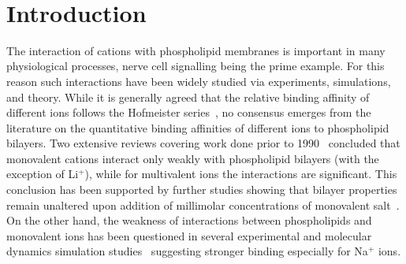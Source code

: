 \documentclass[pre,aps,floatfix,authordate1-4,twocolumn]{revtex4-1}
\begin{document}
\maketitle


~\vspace{0.3cm}\\
{\it \bf} 

\section{Introduction}

The interaction of cations with phospholipid membranes is important in many physiological processes, 
nerve cell signalling being the prime example.
For this reason such interactions have been widely studied via experiments, simulations, and theory. 
While it is generally agreed that the relative binding affinity of different
ions follows the Hofmeister series~\cite{eisenberg79,cevc90,tocanne90,binder02,celma07,leontidis09,vacha09a,klasczyk10,harb13}, 
no consensus emerges from the literature on the quantitative binding affinities of different ions to phospholipid bilayers. 
Two extensive reviews covering work done prior to 1990~\cite{cevc90,tocanne90}
concluded that monovalent cations interact only weakly with phospholipid bilayers (with the exception of Li$^+$), 
while for multivalent ions the interactions are significant. This conclusion has been supported by
further studies showing that bilayer properties remain unaltered upon addition of millimolar concentrations of monovalent 
salt~\cite{binder02,pabst07,filippov09}. 
On the other hand, the weakness of interactions between phospholipids and monovalent ions
has been questioned in several experimental and molecular dynamics simulation 
studies~\cite{bockmann03,bockmann04,vacha09a,manyes05,manyes06,fukuma07,leontidis09,ferber11,morata12,klasczyk10,harb13}
suggesting stronger binding especially for Na$^{+}$ ions.
\end{document}
